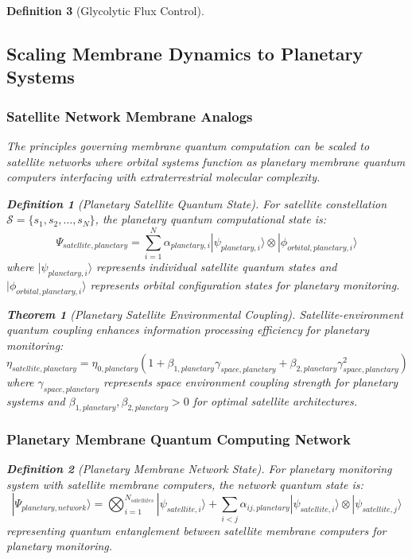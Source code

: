 \documentclass[12pt,a4paper]{article}
\newtheorem{theorem}{Theorem}
\newtheorem{definition}{Definition}
\begin{document}
\begin{definition}[Glycolytic Flux Control]
\subsection{Scaling Membrane Dynamics to Planetary Systems}

\subsubsection{Satellite Network Membrane Analogs}

The principles governing membrane quantum computation can be scaled to satellite networks where orbital systems function as planetary membrane quantum computers interfacing with extraterrestrial molecular complexity.

\begin{definition}[Planetary Satellite Quantum State]
For satellite constellation $\mathcal{S} = \{s_1, s_2, \ldots, s_N\}$, the planetary quantum computational state is:
\begin{equation}
\Psi_{satellite,planetary} = \sum_{i=1}^N \alpha_{planetary,i} |\psi_{planetary,i}\rangle \otimes |\phi_{orbital,planetary,i}\rangle
\end{equation}
where $|\psi_{planetary,i}\rangle$ represents individual satellite quantum states and $|\phi_{orbital,planetary,i}\rangle$ represents orbital configuration states for planetary monitoring.
\end{definition}

\begin{theorem}[Planetary Satellite Environmental Coupling]
Satellite-environment quantum coupling enhances information processing efficiency for planetary monitoring:
\begin{equation}
\eta_{satellite,planetary} = \eta_{0,planetary} \left(1 + \beta_{1,planetary} \gamma_{space,planetary} + \beta_{2,planetary} \gamma_{space,planetary}^2\right)
\end{equation}
where $\gamma_{space,planetary}$ represents space environment coupling strength for planetary systems and $\beta_{1,planetary}, \beta_{2,planetary} > 0$ for optimal satellite architectures.
\end{theorem}

\subsubsection{Planetary Membrane Quantum Computing Network}

\begin{definition}[Planetary Membrane Network State]
For planetary monitoring system with satellite membrane computers, the network quantum state is:
\begin{equation}
|\Psi_{planetary,network}\rangle = \bigotimes_{i=1}^{N_{satellites}} |\psi_{satellite,i}\rangle + \sum_{i<j} \alpha_{ij,planetary} |\psi_{satellite,i}\rangle \otimes |\psi_{satellite,j}\rangle
\end{equation}
representing quantum entanglement between satellite membrane computers for planetary monitoring.
\end{definition}


\end{definition}
\end{document}
